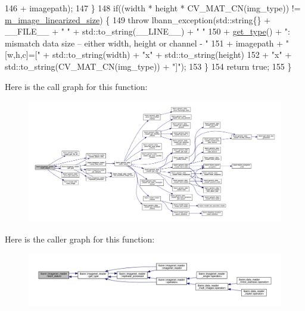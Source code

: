 \begin{DoxyCode}
146                           + imagepath);
147   \}
148   \textcolor{keywordflow}{if}((width * height * CV\_MAT\_CN(img\_type)) != \hyperlink{classlbann_1_1image__data__reader_af512f1f866c0f654309b7f28886dca9a}{m\_image\_linearized\_size}) \{
149     \textcolor{keywordflow}{throw} lbann\_exception(std::string\{\} + \_\_FILE\_\_ + \textcolor{stringliteral}{" "} + std::to\_string(\_\_LINE\_\_) + \textcolor{stringliteral}{" "}
150                           + \hyperlink{classlbann_1_1imagenet__reader_a0afea0db8b4286b56211842f8f1d7678}{get\_type}() + \textcolor{stringliteral}{": mismatch data size -- either width, height or channel -
       "}
151                           + imagepath + \textcolor{stringliteral}{"[w,h,c]=["} + std::to\_string(width) + \textcolor{stringliteral}{"x"} + std::to\_string(height)
152                           + \textcolor{stringliteral}{"x"} + std::to\_string(CV\_MAT\_CN(img\_type)) + \textcolor{stringliteral}{"]"});
153   \}
154   \textcolor{keywordflow}{return} \textcolor{keyword}{true};
155 \}
\end{DoxyCode}
Here is the call graph for this function\+:\nopagebreak
\begin{figure}[H]
\begin{center}
\leavevmode
\includegraphics[width=350pt]{classlbann_1_1imagenet__reader_a6659e90c0243da40f214a877f65eb8ac_cgraph}
\end{center}
\end{figure}
Here is the caller graph for this function\+:\nopagebreak
\begin{figure}[H]
\begin{center}
\leavevmode
\includegraphics[width=350pt]{classlbann_1_1imagenet__reader_a6659e90c0243da40f214a877f65eb8ac_icgraph}
\end{center}
\end{figure}
\mbox{\label{classlbann_1_1imagenet__reader_a0afea0db8b4286b56211842f8f1d7678}} 
